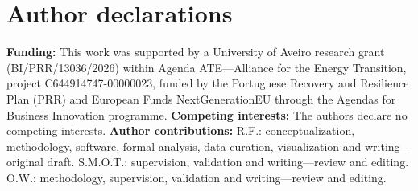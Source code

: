 \documentclass[10pt,twocolumn]{article}
\begin{document}
\section*{Author declarations}
\textbf{Funding:} This work was supported by a University of Aveiro research grant (BI/PRR/13036/2026) within Agenda ATE---Alliance for the Energy Transition, project C644914747-00000023, funded by the Portuguese Recovery and Resilience Plan (PRR) and European Funds NextGenerationEU through the Agendas for Business Innovation programme.
\textbf{Competing interests:} The authors declare no competing interests.
\textbf{Author contributions:} R.F.: conceptualization, methodology, software, formal analysis, data curation, visualization and writing---original draft. S.M.O.T.: supervision, validation and writing---review and editing. O.W.: methodology, supervision, validation and writing---review and editing.


\end{document}
